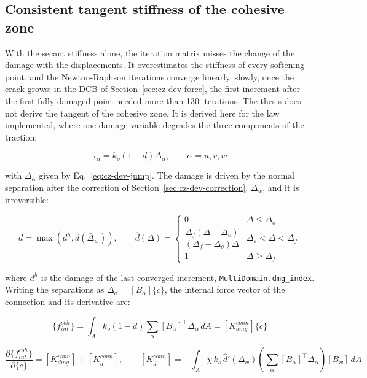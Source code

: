 \subsection{Consistent tangent stiffness of the cohesive zone}\label{sec:cz-dev-tangent}

With the secant stiffness alone, the iteration matrix misses the change of the damage with the displacements. It overestimates the stiffness of every softening point, and the Newton-Raphson iterations converge linearly, slowly, once the crack grows: in the DCB of Section~\ref{sec:cz-dev-force}, the first increment after the first fully damaged point needed more than 130 iterations. The thesis does not derive the tangent of the cohesive zone. It is derived here for the law implemented, where one damage variable degrades the three components of the traction:

\begin{equation}\label{eq:cz-dev-law}
	\tau_\alpha = k_o \left(1 - d\right) \Delta_\alpha, \qquad \alpha = u, v, w
\end{equation}

\noindent with $\Delta_\alpha$ given by Eq.~\ref{eq:cz-dev-jump}. The damage is driven by the normal separation after the correction of Section~\ref{sec:cz-dev-correction}, $\bar\Delta_w$, and it is irreversible:

\begin{equation}\label{eq:cz-dev-damage}
	d = \max\left( d^{h}, \hat d(\bar\Delta_w) \right), \qquad
	\hat d(\Delta) = \begin{cases}
		0 & \Delta \le \Delta_o \\
		\dfrac{\Delta_f (\Delta - \Delta_o)}{(\Delta_f - \Delta_o) \Delta} & \Delta_o < \Delta < \Delta_f \\
		1 & \Delta \ge \Delta_f
	\end{cases}
\end{equation}

\noindent where $d^h$ is the damage of the last converged increment, \texttt{MultiDomain.dmg\_index}. Writing the separations as $\Delta_\alpha = [B_\alpha]\{c\}$, the internal force vector of the connection and its derivative are:

\begin{equation}\label{eq:cz-dev-fint-coh}
	\{f^{coh}_{int}\} = \int_A k_o (1 - d) \sum_\alpha [B_\alpha]^\top \Delta_\alpha \, dA = [K^{conn}_{dmg}]\{c\}
\end{equation}

\begin{equation}\label{eq:cz-dev-tangent}
	\frac{\partial \{f^{coh}_{int}\}}{\partial \{c\}} = [K^{conn}_{dmg}] + [K^{conn}_{\dot d}], \qquad
	[K^{conn}_{\dot d}] = - \int_A \chi \, k_o \, \hat d'(\Delta_w) \left( \sum_\alpha [B_\alpha]^\top \Delta_\alpha \right) [B_w] \, dA
\end{equation}

